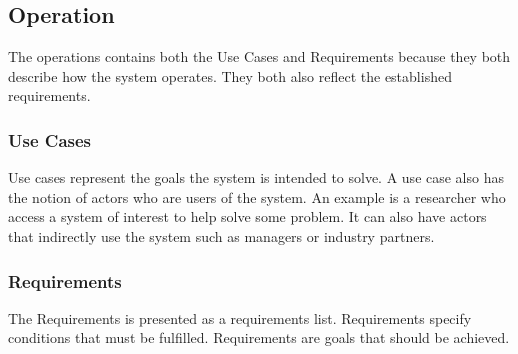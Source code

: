 \subsection{Operation}\label{sc:operation}
The operations contains both the Use Cases and Requirements because they both describe how the system operates. They both also reflect the established requirements.

\subsubsection{Use Cases}\label{ssc:usecases}
Use cases represent the goals the system is intended to solve. A use case also has the notion of actors who are users of the system. An example is a researcher who access a system of interest to help solve some problem. It can also have actors that indirectly use the system such as managers or industry partners.

\subsubsection{Requirements}\label{ssc:requirements}
The Requirements is presented as a requirements list. Requirements specify conditions that must be fulfilled. Requirements are goals that should be achieved. 